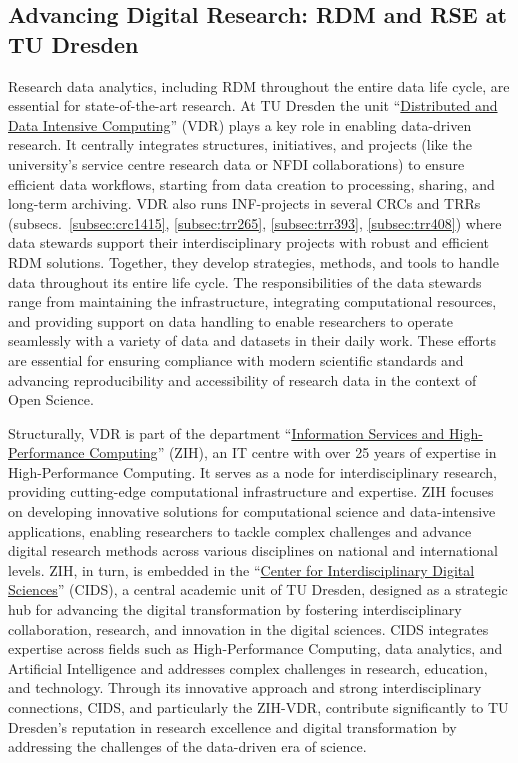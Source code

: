 \documentclass{eceasst}
\begin{document}
\subsection{Advancing Digital Research: RDM and RSE at TU Dresden}
\label{subsec:vdr}
Research data analytics, including RDM throughout the entire data life cycle, are essential for state-of-the-art research.
At TU Dresden the unit ``\href{https://tu-dresden.de/zih/forschung/datenintensives_rechnen}{Distributed and Data Intensive Computing}'' (VDR) plays a key role in enabling data-driven research.
It centrally integrates structures, initiatives, and projects (like the university’s service centre research data or NFDI collaborations)
to ensure efficient data workflows, starting from data creation to processing, sharing, and long-term archiving.
VDR also runs INF-projects in several CRCs and TRRs (subsecs.~\ref{subsec:crc1415}, \ref{subsec:trr265}, \ref{subsec:trr393}, \ref{subsec:trr408}) where data stewards support their interdisciplinary projects with robust and
efficient RDM solutions.
Together, they develop strategies, methods, and tools to handle data throughout its entire life cycle.
The responsibilities of the data stewards range from maintaining the infrastructure, integrating computational resources,
and providing support on data handling to enable researchers to operate seamlessly with a variety of data and datasets in their daily work.
These efforts are essential for ensuring compliance with modern scientific standards and advancing reproducibility and accessibility
 of research data in the context of Open Science.

Structurally, VDR is part of the department ``\href{https://tu-dresden.de/zih}{Information Services and High-Performance Computing}'' (ZIH), an IT centre with over 25 years of expertise in High-Performance Computing.
It serves as a node for interdisciplinary research, providing cutting-edge computational infrastructure and expertise.
ZIH focuses on developing innovative solutions for computational science and data-intensive applications,
enabling researchers to tackle complex challenges and advance digital research methods across various disciplines on national and international levels.
ZIH, in turn, is embedded in the ``\href{https://tu-dresden.de/cids}{Center for Interdisciplinary Digital Sciences}'' (CIDS), a central academic unit of TU Dresden, designed as a
strategic hub for advancing the digital transformation by fostering interdisciplinary collaboration, research, and innovation in the digital sciences.
CIDS integrates expertise across fields such as High-Performance Computing, data analytics, and Artificial Intelligence and addresses complex challenges in research, education, and technology.
Through its innovative approach and strong interdisciplinary connections, CIDS, and particularly the ZIH-VDR, contribute significantly
to TU Dresden’s reputation in research excellence and digital transformation by addressing the challenges of the data-driven era of science.
\end{document}
